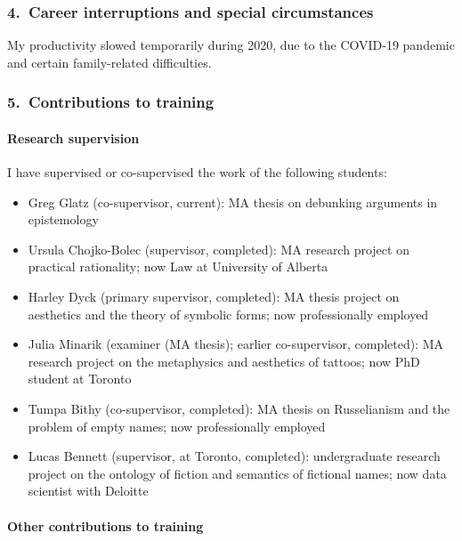 \documentclass[12pt]{article}
\begin{document}
\subsubsection*{4.\ \quad Career interruptions and special circumstances}

My productivity slowed temporarily during 2020, due to the COVID-19 pandemic
and certain family-related difficulties.


\subsubsection*{5.\ \quad Contributions to training}

\paragraph{Research supervision}

I have supervised or co-supervised the work of the following students: 

\begin{itemize}

\item[] Greg Glatz (co-supervisor, current): MA thesis on debunking arguments
in epistemology

\item[] Ursula Chojko-Bolec (supervisor, completed): MA research project on practical
rationality; now Law at University of Alberta  

\item[] Harley Dyck (primary supervisor, completed): MA thesis project on aesthetics and the theory of
symbolic forms; now professionally employed 

\item[] Julia Minarik (examiner (MA thesis); earlier co-supervisor,
completed): MA research project on the metaphysics and aesthetics of tattoos; now PhD
student at Toronto  

\item[]  Tumpa Bithy (co-supervisor, completed): MA thesis on Russelianism and the problem
of empty names; now professionally employed

\item[] Lucas Bennett (supervisor, at Toronto, completed): undergraduate
research project on the ontology of fiction and semantics of fictional names;
now data scientist with Deloitte 


\end{itemize}
 
\paragraph{Other contributions to training}
\end{document}
